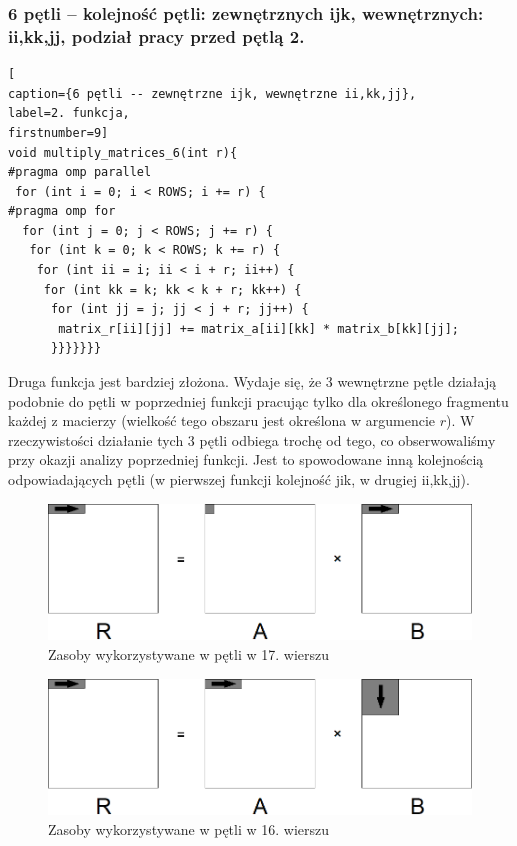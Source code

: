 \documentclass{article}
\begin{document}
\subsubsection{6 pętli -- kolejność pętli: zewnętrznych ijk, wewnętrznych: ii,kk,jj, podział pracy przed pętlą 2.}
\begin{lstlisting}[
caption={6 pętli -- zewnętrzne ijk, wewnętrzne ii,kk,jj},
label=2. funkcja,
firstnumber=9]
void multiply_matrices_6(int r){
#pragma omp parallel
 for (int i = 0; i < ROWS; i += r) {
#pragma omp for
  for (int j = 0; j < ROWS; j += r) {
   for (int k = 0; k < ROWS; k += r) {
    for (int ii = i; ii < i + r; ii++) {
     for (int kk = k; kk < k + r; kk++) {
      for (int jj = j; jj < j + r; jj++) {
       matrix_r[ii][jj] += matrix_a[ii][kk] * matrix_b[kk][jj];
      }}}}}}}
\end{lstlisting}

Druga funkcja jest bardziej złożona. Wydaje się, że 3 wewnętrzne pętle działają podobnie do pętli w poprzedniej funkcji pracując tylko dla określonego fragmentu każdej z macierzy (wielkość tego obszaru jest określona w argumencie $r$). W rzeczywistości działanie tych 3 pętli odbiega trochę od tego, co obserwowaliśmy przy okazji analizy poprzedniej funkcji. Jest to spowodowane inną kolejnością odpowiadających pętli (w pierwszej funkcji kolejność jik, w drugiej ii,kk,jj).

\begin{figure}[H]
	\centering
	\includegraphics[width=\linewidth]{./images/6/lokIn1.png}
	\caption{Zasoby wykorzystywane w pętli w 17. wierszu}
	\label{fig:6inner1}
\end{figure}

\begin{figure}[H]
	\centering
	\includegraphics[width=\linewidth]{./images/6/lokIn2.png}
	\caption{Zasoby wykorzystywane w pętli w 16. wierszu}
	\label{fig:6inner2}
\end{figure}
\end{document}
